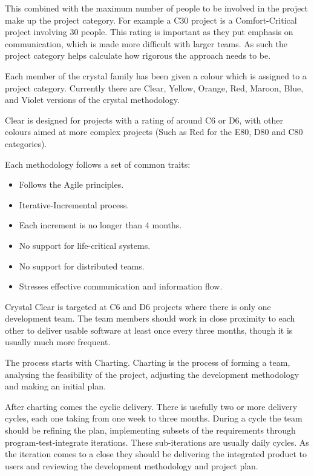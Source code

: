 \documentclass[11pt,a4paper]{article}
\begin{document}
This combined with the maximum number of people to be involved in the project make up the project category. For example a C30 project is a Comfort-Critical project involving 30 people. This rating is important as they put emphasis on communication, which is made more difficult with larger teams. As such the project category helps calculate how rigorous the approach needs to be. 

Each member of the crystal family has been given a colour which is assigned to a project category. Currently there are Clear, Yellow, Orange, Red, Maroon, Blue, and Violet versions of the crystal methodology. 

Clear is designed for projects with a rating of around C6 or D6, with other colours aimed at more complex projects (Such as Red for the E80, D80 and C80 categories). 

Each methodology follows a set of common traits:

\begin{itemize}
\item Follows the Agile principles. 
\item Iterative-Incremental process. 
\item Each increment is no longer than 4 months.
\item No support for life-critical systems.
\item No support for distributed teams. 
\item Stresses effective communication and information flow. 
\end{itemize}

Crystal Clear is targeted at C6 and D6 projects where there is only one development team. The team members should work in close proximity to each other to deliver usable software at least once every three months, though it is usually much more frequent. 

The process starts with Charting. Charting is the process of forming a team, analysing the feasibility of the project, adjusting the development methodology and making an initial plan. 

After charting comes the cyclic delivery. There is usefully two or more delivery cycles, each one taking from one week to three months. During a cycle the team should be refining the plan, implementing subsets of the requirements through program-test-integrate iterations. These sub-iterations are usually daily cycles. As the iteration comes to a close they should be delivering the integrated product to users and reviewing the development methodology and project plan.
\end{document}
